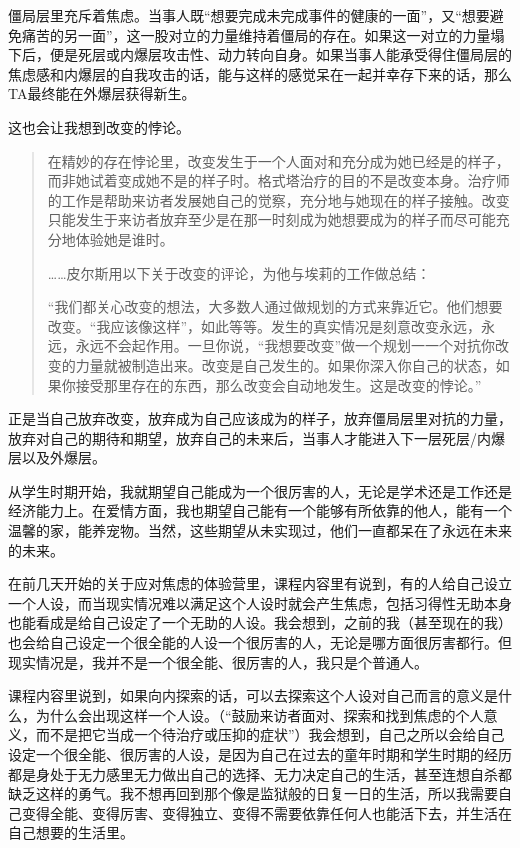 僵局层里充斥着焦虑。当事人既“想要完成未完成事件的健康的一面”，又“想要避免痛苦的另一面”，这一股对立的力量维持着僵局的存在。如果这一对立的力量塌下后，便是死层或内爆层\pozhehao{}攻击性、动力转向自身。如果当事人能承受得住僵局层的焦虑感和内爆层的自我攻击的话，能与这样的感觉呆在一起并幸存下来的话，那么TA最终能在外爆层获得新生。

这也会让我想到改变的悖论。

\blockquote{
	在精妙的存在悖论里，改变发生于一个人面对和充分成为她已经是的样子，而非她试着变成她不是的样子时。格式塔治疗的目的不是改变本身。治疗师的工作是帮助来访者发展她自己的觉察，充分地与她现在的样子接触。改变只能发生于来访者放弃\pozhehao{}至少是在那一时刻成为她想要成为的样子而尽可能充分地体验她是谁时。

	……皮尔斯用以下关于改变的评论，为他与埃莉的工作做总结：

	“我们都关心改变的想法，大多数人通过做规划的方式来靠近它。他们想要改变。“我应该像这样”，如此等等。发生的真实情况是刻意改变永远，永远，永远不会起作用。一旦你说，“我想要改变”做一个规划一一个对抗你改变的力量就被制造出来。改变是自己发生的。如果你深入你自己的状态，如果你接受那里存在的东西，那么改变会自动地发生。这是改变的悖论。”

}

正是当自己放弃改变，放弃成为自己应该成为的样子，放弃僵局层里对抗的力量，放弃对自己的期待和期望，放弃自己的未来后，当事人才能进入下一层\pozhehao{}死层/内爆层以及外爆层。

从学生时期开始，我就期望自己能成为一个很厉害的人，无论是学术还是工作还是经济能力上。在爱情方面，我也期望自己能有一个能够有所依靠的他人，能有一个温馨的家，能养宠物。当然，这些期望从未实现过，他们一直都呆在了永远在未来的未来。

在前几天开始的关于应对焦虑的体验营里，课程内容里有说到，有的人给自己设立一个人设，而当现实情况难以满足这个人设时就会产生焦虑，包括习得性无助本身也能看成是给自己设定了一个无助的人设。我会想到，之前的我（甚至现在的我）也会给自己设定一个很全能的人设\pozhehao{}一个很厉害的人，无论是哪方面很厉害都行。但现实情况是，我并不是一个很全能、很厉害的人，我只是个普通人。

课程内容里说到，如果向内探索的话，可以去探索这个人设对自己而言的意义是什么，为什么会出现这样一个人设。（“鼓励来访者面对、探索和找到焦虑的个人意义，而不是把它当成一个待治疗或压抑的症状”）我会想到，自己之所以会给自己设定一个很全能、很厉害的人设，是因为自己在过去的童年时期和学生时期的经历都是身处于无力感里\pozhehao{}无力做出自己的选择、无力决定自己的生活，甚至连想自杀都缺乏这样的勇气。我不想再回到那个像是监狱般的日复一日的生活，所以我需要自己变得全能、变得厉害、变得独立、变得不需要依靠任何人也能活下去，并生活在自己想要的生活里。

